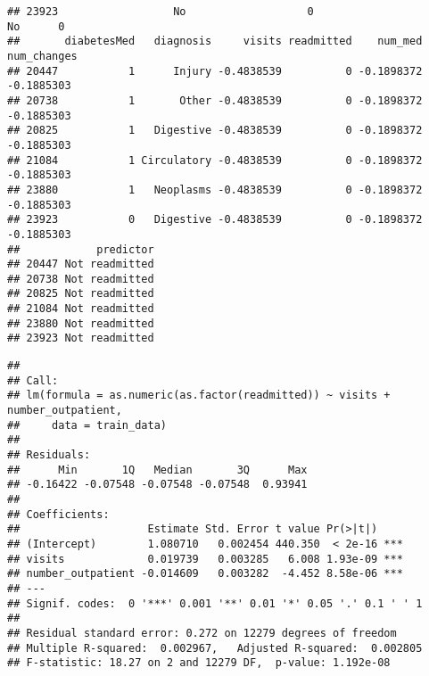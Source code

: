 \documentclass[
]{article}
\newenvironment{Shaded}{\begin{snugshade}}{\end{snugshade}}
\newcommand{\AttributeTok}[1]{\textcolor[rgb]{0.13,0.29,0.53}{#1}}
\newcommand{\CommentTok}[1]{\textcolor[rgb]{0.56,0.35,0.01}{\textit{#1}}}
\newcommand{\FunctionTok}[1]{\textcolor[rgb]{0.13,0.29,0.53}{\textbf{#1}}}
\newcommand{\NormalTok}[1]{#1}
\newcommand{\OtherTok}[1]{\textcolor[rgb]{0.56,0.35,0.01}{#1}}
\newcommand{\SpecialCharTok}[1]{\textcolor[rgb]{0.81,0.36,0.00}{\textbf{#1}}}
\begin{document}
\begin{verbatim}
## 23923                  No                   0                     No      0
##       diabetesMed   diagnosis     visits readmitted    num_med num_changes
## 20447           1      Injury -0.4838539          0 -0.1898372  -0.1885303
## 20738           1       Other -0.4838539          0 -0.1898372  -0.1885303
## 20825           1   Digestive -0.4838539          0 -0.1898372  -0.1885303
## 21084           1 Circulatory -0.4838539          0 -0.1898372  -0.1885303
## 23880           1   Neoplasms -0.4838539          0 -0.1898372  -0.1885303
## 23923           0   Digestive -0.4838539          0 -0.1898372  -0.1885303
##            predictor
## 20447 Not readmitted
## 20738 Not readmitted
## 20825 Not readmitted
## 21084 Not readmitted
## 23880 Not readmitted
## 23923 Not readmitted
\end{verbatim}

\begin{Shaded}
\end{Shaded}

\begin{verbatim}
## 
## Call:
## lm(formula = as.numeric(as.factor(readmitted)) ~ visits + number_outpatient, 
##     data = train_data)
## 
## Residuals:
##      Min       1Q   Median       3Q      Max 
## -0.16422 -0.07548 -0.07548 -0.07548  0.93941 
## 
## Coefficients:
##                    Estimate Std. Error t value Pr(>|t|)    
## (Intercept)        1.080710   0.002454 440.350  < 2e-16 ***
## visits             0.019739   0.003285   6.008 1.93e-09 ***
## number_outpatient -0.014609   0.003282  -4.452 8.58e-06 ***
## ---
## Signif. codes:  0 '***' 0.001 '**' 0.01 '*' 0.05 '.' 0.1 ' ' 1
## 
## Residual standard error: 0.272 on 12279 degrees of freedom
## Multiple R-squared:  0.002967,   Adjusted R-squared:  0.002805 
## F-statistic: 18.27 on 2 and 12279 DF,  p-value: 1.192e-08
\end{verbatim}
\end{document}
